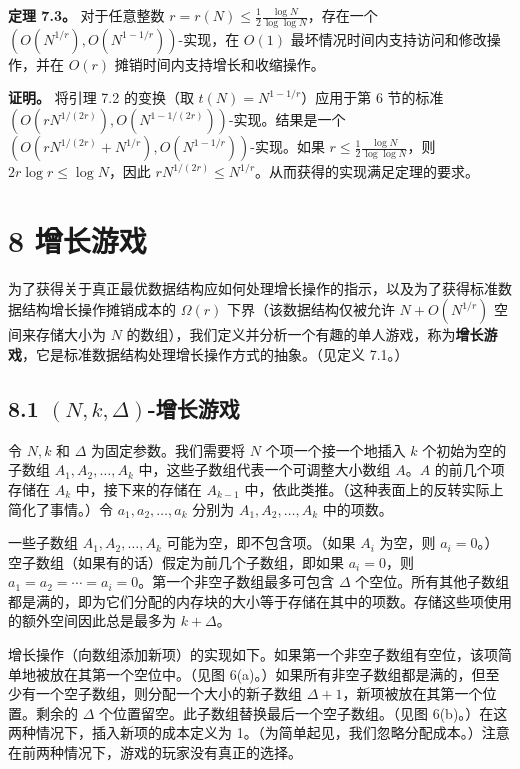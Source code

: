 \documentclass[12pt,a4paper]{ctexart}
\theoremstyle{remark}
\begin{document}
\textbf{定理 7.3。} 对于任意整数 $r=r(N)\leq\frac{1}{2}\frac{\log N}{\log\log N}$，存在一个 $(O(N^{1/r}),O(N^{1-1/r}))$-实现，在 $O(1)$ 最坏情况时间内支持访问和修改操作，并在 $O(r)$ 摊销时间内支持增长和收缩操作。

\textbf{证明。} 将引理 7.2 的变换（取 $t(N)=N^{1-1/r}$）应用于第 6 节的标准 $(O(rN^{1/(2r)}),O(N^{1-1/(2r)}))$-实现。结果是一个 $(O(rN^{1/(2r)}+N^{1/r}),O(N^{1-1/r}))$-实现。如果 $r\leq\frac{1}{2}\frac{\log N}{\log\log N}$，则 $2r\log r\leq\log N$，因此 $rN^{1/(2r)}\leq N^{1/r}$。从而获得的实现满足定理的要求。

\section{8 增长游戏}

为了获得关于真正最优数据结构应如何处理增长操作的指示，以及为了获得标准数据结构增长操作摊销成本的 $\Omega(r)$ 下界（该数据结构仅被允许 $N+O(N^{1/r})$ 空间来存储大小为 $N$ 的数组），我们定义并分析一个有趣的单人游戏，称为\textbf{增长游戏}，它是标准数据结构处理增长操作方式的抽象。（见定义 7.1。）

\subsection{8.1 $(N,k,\Delta)$-增长游戏}

令 $N,k$ 和 $\Delta$ 为固定参数。我们需要将 $N$ 个项一个接一个地插入 $k$ 个初始为空的子数组 $A_1,A_2,\ldots,A_k$ 中，这些子数组代表一个可调整大小数组 $A$。$A$ 的前几个项存储在 $A_k$ 中，接下来的存储在 $A_{k-1}$ 中，依此类推。（这种表面上的反转实际上简化了事情。）令 $a_1,a_2,\ldots,a_k$ 分别为 $A_1,A_2,\ldots,A_k$ 中的项数。

一些子数组 $A_1,A_2,\ldots,A_k$ 可能为空，即不包含项。（如果 $A_i$ 为空，则 $a_i=0$。）空子数组（如果有的话）假定为前几个子数组，即如果 $a_i=0$，则 $a_1=a_2=\cdots=a_i=0$。第一个非空子数组最多可包含 $\Delta$ 个空位。所有其他子数组都是满的，即为它们分配的内存块的大小等于存储在其中的项数。存储这些项使用的额外空间因此总是最多为 $k+\Delta$。

增长操作（向数组添加新项）的实现如下。如果第一个非空子数组有空位，该项简单地被放在其第一个空位中。（见图 6(a)。）如果所有非空子数组都是满的，但至少有一个空子数组，则分配一个大小的新子数组 $\Delta+1$，新项被放在其第一个位置。剩余的 $\Delta$ 个位置留空。此子数组替换最后一个空子数组。（见图 6(b)。）在这两种情况下，插入新项的成本定义为 1。（为简单起见，我们忽略分配成本。）注意在前两种情况下，游戏的玩家没有真正的选择。
\end{document}
